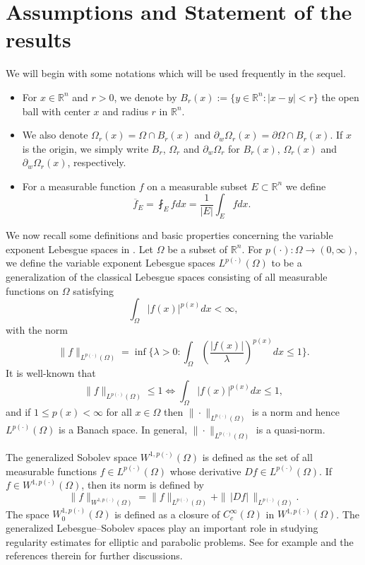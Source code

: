 \documentclass[a4paper,10pt]{amsart}
\newcommand{\pd}{p(\cdot)}
\newcommand{\f}{\frac}
\newcommand{\Om}{\Omega}
\newcommand{\vc}{\infty}
\begin{document}
\section{Assumptions  and Statement of the results}

We will begin with some notations which will be used frequently in the sequel.
\begin{itemize}
	
	\item For $x\in \mathbb{R}^n$ and $r>0$, we denote by $B_r(x):=\{y\in \mathbb{R}^n: |x-y|<r\}$ the open ball with center $x$ 
	and radius $r$ in $\mathbb{R}^{n}$.
	
	\item We also denote $\Om_r(x)=\Om\cap B_r(x)$ and $\partial_w \Om_r(x)=\partial \Om\cap B_r(x)$. If $x$ is the origin, we simply write $B_r$, $\Om_r$ and $\partial_w\Om_r$ for $B_r(x)$, $\Om_r(x)$ and $\partial_w\Om_r(x)$, respectively.
	
	\item For a measurable function $f$ on a measurable subset $E\subset \mathbb{R}^{n}$ we define
	$$
	\overline{f}_E =\fint_E f dx=\f{1}{|E|}\int_E f dx.
	$$
\end{itemize}

We now recall  some definitions and basic properties concerning the variable exponent Lebesgue spaces in \cite{CF}. 
Let $\Omega$ be a subset of $\mathbb{R}^n$. For $p(\cdot) : \Om \to (0,\vc)$, we define the variable exponent  Lebesgue spaces $L^{p(\cdot)}(\Om)$ to be a generalization of the classical Lebesgue
spaces consisting of all measurable functions on $\Om$ satisfying
$$
\int_\Om |f(x)|^{p(x)} dx<\vc,
$$
with the norm
$$
\|f\|_{L^{p(\cdot)}(\Om)}=\inf\Big\{\lambda>0: \int_{\Omega}\left(\f{|f(x)|}{\lambda}\right)^{p(x)}dx\leq 1\Big\}.
$$
It is well-known that
$$
\|f\|_{L^{p(\cdot)}(\Om)}\leq 1 \Longleftrightarrow \int_\Om |f(x)|^{p(x)} dx\leq 1,
$$
and  if $1\leq p(x)<\vc$ for all $x\in \Om$ then $\|\cdot\|_{L^{p(\cdot)}(\Om)}$ is a norm and hence $L^{p(\cdot)}(\Om)$ is a Banach space. In general, $\|\cdot\|_{L^{p(\cdot)}(\Om)}$  is a quasi-norm.

The generalized Sobolev space $W^{1,\pd}(\Om)$ is defined as the set of all measurable functions $f\in L^{\pd}(\Om)$ whose derivative $Df\in L^{\pd}(\Om)$. If $f\in W^{1,\pd}(\Om)$, then its norm is defined by
$$
\|f\|_{W^{1,\pd}(\Om)}=\|f\|_{L^{\pd}(\Om)}+\|\,|Df|\,\|_{L^{\pd}(\Om)}.
$$ 
The space $W^{1,\pd}_0(\Om)$ is defined as a closure of $C^\vc_c(\Om)$ in $W^{1,\pd}(\Om)$. The generalized Lebesgue--Sobolev spaces play an important role in studying regularity estimates for elliptic and parabolic problems. See for example \cite{DR, Dea, CF} and the references therein for further discussions.
\end{document}
